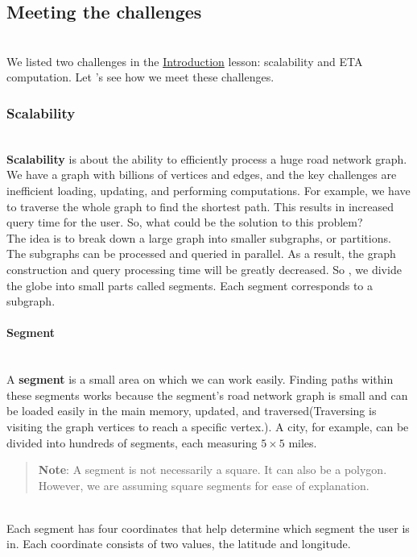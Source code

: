 

\subsection{Meeting the challenges}\label{TuAkuVwJVKpzgtChrWw_I}
\\
We listed two challenges in the \href{https://www.educative.io/courses/grokking-the-system-design-interview/requirements-of-google-maps-design\#Challenges}{Introduction} lesson: scalability and ETA computation. Let 's see how we meet these challenges.

\subsubsection{Scalability}\label{yGTaXDgk6ilZgqG-i0mfG}
\\
\textbf{Scalability} is about the ability to efficiently process a huge road network graph. We have a graph with billions of vertices and edges, and the key challenges are inefficient loading, updating, and performing computations. For example, we have to traverse the whole graph to find the shortest path. This results in increased query time for the user. So, what could be the solution to this problem?
\\
The idea is to break down a large graph into smaller subgraphs, or partitions. The subgraphs can be processed and queried in parallel. As a result, the graph construction and query processing time will be greatly decreased. So , we divide the globe into small parts called segments. Each segment corresponds to a subgraph.
\\
\paragraph{Segment}\label{GnRgIyzlLJhIYx5yrloQQ}
\\
A \textbf{segment} is a small area on which we can work easily. Finding paths within these segments works because the segment's road network graph is small and can be loaded easily in the main memory, updated, and traversed(Traversing is visiting the graph vertices to reach a specific vertex.). A city, for example, can be divided into hundreds of segments, each measuring \protect{}\label{katex_inline_YMGJVQGAtHE7KazGAMvvD}{{{\(5 \times 5\)}}} miles.
\begin{quote}
\textbf{Note}: A segment is not necessarily a square. It can also be a polygon. However, we are assuming square segments for ease of explanation.
\end{quote}
\\
Each segment has four coordinates that help determine which segment the user is in. Each coordinate consists of two values, the latitude and longitude.

